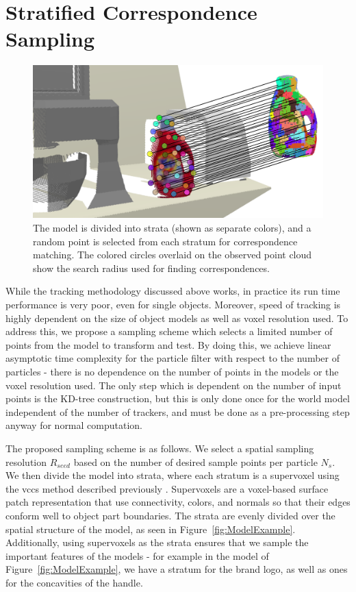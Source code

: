 \section{Stratified Correspondence Sampling}
\label{sec:StratCorrSampling}
\begin{figure}[]
  \centering
  \includegraphics[width=\textwidth]{figures/Tracking/StratifiedCorrespondences.pdf}
  \caption[Stratified Correspondence Matching]{The model is divided into strata (shown as separate colors), and a random point is selected from each stratum for correspondence matching. The colored circles overlaid on the observed point cloud show the search radius used for finding correspondences.}
  \label{fig:Strata}
\end{figure}
While the tracking methodology discussed above works, in practice its run time performance is very poor, even for single objects. Moreover, speed of tracking is highly dependent on the size of object models as well as voxel resolution used. To address this, we propose a sampling scheme which selects a limited number of points from the model to transform and test. By doing this, we achieve linear asymptotic time complexity for the particle filter with respect to the number of particles - there is no dependence on the number of points in the models or the voxel resolution used. The only step which is dependent on the number of input points is the KD-tree construction, but this is only done once for the world model independent of the number of trackers, and must be done as a pre-processing step anyway for normal computation.

The proposed sampling scheme is as follows. We select a spatial sampling resolution $R_{seed}$ based on the number of desired sample points per particle $N_s$. We then divide the model into strata, where each stratum is a supervoxel using the \gls{vccs} method described previously \cite{VCCS_Papon_2013}. Supervoxels are a voxel-based surface patch representation that use connectivity, colors, and normals so that their edges conform well to object part boundaries. The strata are evenly divided over the spatial structure of the model, as seen in Figure~\ref{fig:ModelExample}. Additionally, using supervoxels as the strata ensures that we sample the important features of the models - for example in the model of Figure~\ref{fig:ModelExample}, we have a stratum for the brand logo, as well as ones for the concavities of the handle. 

